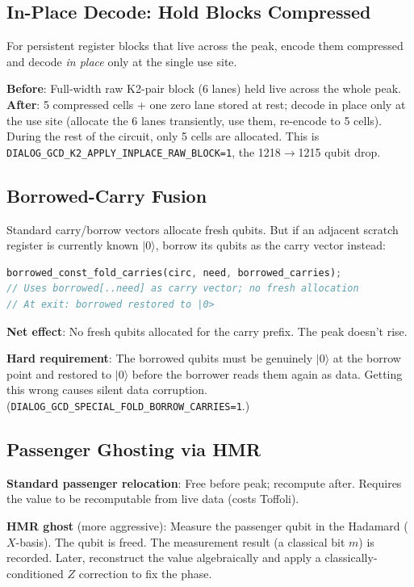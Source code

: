 \documentclass[11pt,a4paper]{article}
\newcommand{\ket}[1]{$|#1\rangle$\xspace}
\begin{document}
\subsection{In-Place Decode: Hold Blocks Compressed}

For persistent register blocks that live across the peak, encode them compressed and decode
\emph{in place} only at the single use site.

\textbf{Before}: Full-width raw K2-pair block (6 lanes) held live across the whole peak.
\textbf{After}: 5 compressed cells + one zero lane stored at rest; decode in place only at the
use site (allocate the 6 lanes transiently, use them, re-encode to 5 cells). During the rest of
the circuit, only 5 cells are allocated. This is \texttt{DIALOG\_GCD\_K2\_APPLY\_INPLACE\_RAW\_BLOCK=1},
the 1218$\to$1215 qubit drop.

\subsection{Borrowed-Carry Fusion}
\label{sec:borrowcarry}

Standard carry/borrow vectors allocate fresh qubits. But if an adjacent scratch register is
currently known \ket{0}, borrow its qubits as the carry vector instead:

\begin{lstlisting}[language=Rust]
borrowed_const_fold_carries(circ, need, borrowed_carries);
// Uses borrowed[..need] as carry vector; no fresh allocation
// At exit: borrowed restored to |0>
\end{lstlisting}

\textbf{Net effect}: No fresh qubits allocated for the carry prefix. The peak doesn't rise.

\textbf{Hard requirement}: The borrowed qubits must be genuinely \ket{0} at the borrow point and
restored to \ket{0} before the borrower reads them again as data. Getting this wrong causes
silent data corruption. (\texttt{DIALOG\_GCD\_SPECIAL\_FOLD\_BORROW\_CARRIES=1}.)

\subsection{Passenger Ghosting via HMR}

\textbf{Standard passenger relocation}: Free before peak; recompute after. Requires the value
to be recomputable from live data (costs Toffoli).

\textbf{HMR ghost} (more aggressive): Measure the passenger qubit in the Hadamard ($X$-basis).
The qubit is freed. The measurement result (a classical bit $m$) is recorded. Later, reconstruct
the value algebraically and apply a classically-conditioned $Z$ correction to fix the phase.
\end{document}
